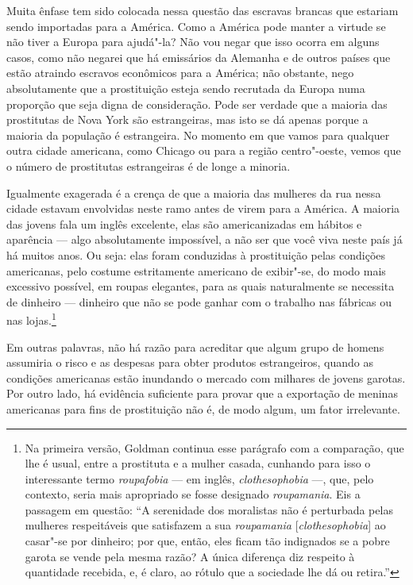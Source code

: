 Muita ênfase tem sido colocada nessa questão das escravas brancas que
estariam sendo importadas para a América. Como a América pode manter a
virtude se não tiver a Europa para ajudá"-la? Não vou negar que isso
ocorra em alguns casos, como não negarei que há emissários da Alemanha e
de outros países que estão atraindo escravos econômicos para a América;
não obstante, nego absolutamente que a prostituição esteja sendo
recrutada da Europa numa proporção que seja digna de consideração. Pode
ser verdade que a maioria das prostitutas de Nova York são estrangeiras,
mas isto se dá apenas porque a maioria da população é estrangeira. No
momento em que vamos para qualquer outra cidade americana, como Chicago
ou para a região centro"-oeste, vemos que o número de prostitutas
estrangeiras é de longe a minoria.

Igualmente exagerada é a crença de que a maioria das mulheres da rua
nessa cidade estavam envolvidas neste ramo antes de virem para a
América. A maioria das jovens fala um inglês excelente, elas são
americanizadas em hábitos e aparência --- algo absolutamente impossível,
a não ser que você viva neste país já há muitos anos. Ou seja: elas
foram conduzidas à prostituição pelas condições americanas, pelo
costume estritamente americano de exibir"-se, do modo mais excessivo
possível, em roupas elegantes, para as quais naturalmente se necessita
de dinheiro --- dinheiro que não se pode ganhar com o trabalho nas
fábricas ou nas lojas.\footnote{Na primeira versão, Goldman continua
  esse parágrafo com a comparação, que lhe é usual, entre a prostituta e
  a mulher casada, cunhando para isso o interessante termo 
  \textit{roupafobia} --- em inglês, \textit{clothesophobia} ---, que, pelo contexto, seria mais
  apropriado se fosse designado \textit{roupamania}. Eis a
  passagem em questão: ``A serenidade dos moralistas não é perturbada
  pelas mulheres respeitáveis que satisfazem a sua \textit{roupamania}
  {[}\textit{clothesophobia}{]} ao casar"-se por dinheiro; por que, então, eles
  ficam tão indignados se a pobre garota se vende pela mesma razão? A
  única diferença diz respeito à quantidade recebida, e, é claro, ao
  rótulo que a sociedade lhe dá ou retira.''}

Em outras palavras, não há razão para acreditar que algum grupo de
homens assumiria o risco e as despesas para obter produtos estrangeiros,
quando as condições americanas estão inundando o mercado com milhares de
jovens garotas. Por outro lado, há evidência suficiente para provar
que a exportação de meninas americanas para fins de prostituição não é,
de modo algum, um fator irrelevante.

